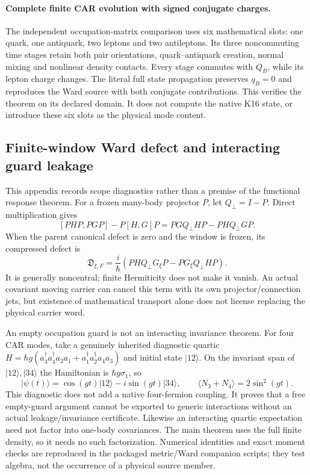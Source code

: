 \documentclass[12pt,a4paper]{article}
\begin{document}
\paragraph{Complete finite CAR evolution with signed conjugate charges.}
The independent occupation-matrix comparison uses six mathematical slots:
one quark, one antiquark, two leptons and two antileptons. Its three
noncommuting time stages retain both pair orientations, quark--antiquark
creation, normal mixing and nonlinear density contacts. Every stage
commutes with $Q_B$, while its lepton charge changes. The literal full
state propagation preserves $q_B=0$ and reproduces the Ward source with
both conjugate contributions. This verifies the theorem on its declared
domain. It does not compute the native K16 state, or introduce these
six slots as the physical mode content.







\subsection{Finite-window Ward defect and interacting guard leakage}
\label{p4:app:v4106-cutoff-ward-defect}
This appendix records scope diagnostics rather than a premise of the
functional response theorem. For a frozen many-body projector $P$,
let $Q_\perp=I-P$. Direct multiplication gives
\[
 [PHP,PGP]-P[H,G]P=PGQ_\perp HP-PHQ_\perp GP.
\]
When the parent canonical defect is zero and the window is frozen, its
compressed defect is
\[
 \mathfrak D_{\xi,F}=\frac{i}{\hbar}
                 (PHQ_\perp G_\xi P-PG_\xi Q_\perp HP).
\]
It is generally noncentral; finite Hermiticity does not make it vanish.
An actual covariant moving carrier can cancel this term with its own
projector/connection jets, but existence of mathematical transport alone
does not license replacing the physical carrier word.

An empty occupation guard is not an interacting invariance theorem.
For four CAR modes, take a genuinely inherited diagnostic quartic
$H=\hbar g(a_3^\dagger a_4^\dagger a_2a_1+
a_1^\dagger a_2^\dagger a_4a_3)$ and initial state $|12\rangle$.
On the invariant span of $|12\rangle,|34\rangle$ the Hamiltonian is
$\hbar g\sigma_1$, so
\[
 |\psi(t)\rangle=\cos(gt)|12\rangle-i\sin(gt)|34\rangle,\qquad
 \langle N_3+N_4\rangle=2\sin^2(gt).
\]
This diagnostic does not add a native four-fermion coupling. It proves
that a free empty-guard argument cannot be exported to generic interactions
without an actual leakage/invariance certificate. Likewise an interacting
quartic expectation need not factor into one-body covariances.
The main theorem uses the full finite density, so it needs no such
factorization. Numerical identities and exact moment checks are reproduced
in the packaged metric/Ward companion scripts; they test algebra, not
the occurrence of a physical source member.
\end{document}
